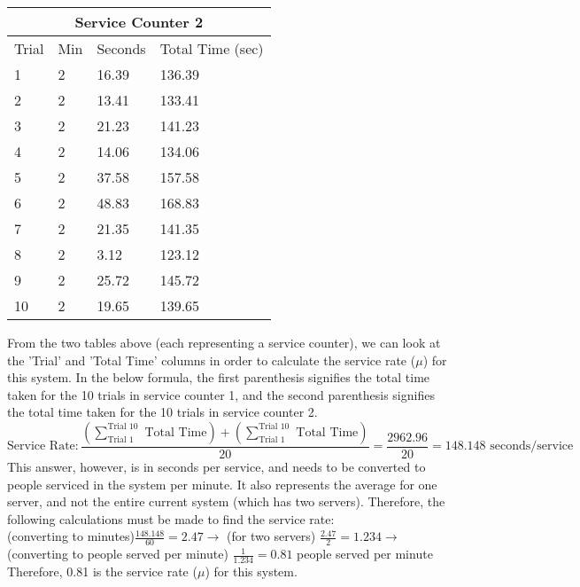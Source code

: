 \documentclass[11pt]{article}
\begin{document}
\begin{center}
\begin{tabular}
{|p{2.2cm}|p{2.2cm}|p{2.2cm}|p{2.6cm}|}
\hline
\multicolumn{4}{|c|}{Service Counter 2} \\
\hline
Trial & Min & Seconds & Total Time (sec) \\
\hline
 1 & 2 & 16.39 & 136.39 \\
 2 & 2 & 13.41 & 133.41 \\
 3 & 2 & 21.23 & 141.23 \\
 4 & 2 & 14.06 & 134.06 \\
 5 & 2 & 37.58 & 157.58 \\
 6 & 2 & 48.83 & 168.83 \\
 7 & 2 & 21.35 & 141.35 \\
 8 & 2 & 3.12 & 123.12 \\
 9 & 2 & 25.72 & 145.72 \\
 10 & 2 & 19.65 & 139.65 \\
\hline
\end{tabular}
\end{center}
 \linebreak
 From the two tables above (each representing a service counter), we can look at the 'Trial' and 'Total Time' columns in order to calculate the service rate ($\mu$) for this system. In the below formula, the first parenthesis signifies the total time taken for the 10 trials in service counter 1, and the second parenthesis signifies the total time taken for the 10 trials in service counter 2.
$$\text{Service Rate}:  \frac{(\sum_{\text{Trial 1}}^{\text{Trial 10}} \text{ Total Time}) + (\sum_{\text{Trial 1}}^{\text{Trial 10}} \text{ Total Time})}{20} = \frac{2962.96}{20} = 148.148 \text{ seconds/service}$$
This answer, however, is in seconds per service, and needs to be converted to people serviced in the system per minute. It also represents the average for one server, and not the entire current system (which has two servers). Therefore, the following calculations must be made to find the service rate:\\
\linebreak
(converting to minutes)$\frac{148.148}{60}=2.47 \longrightarrow$ (for two servers) $\frac{2.47}{2} = 1.234 \longrightarrow{}$ (converting to people served per minute) $\frac{1}{1.234} = \boxed{0.81}$ people served per minute\\
\linebreak
Therefore, 0.81 is the service rate ($\mu$) for this system.
 
\end{document}

